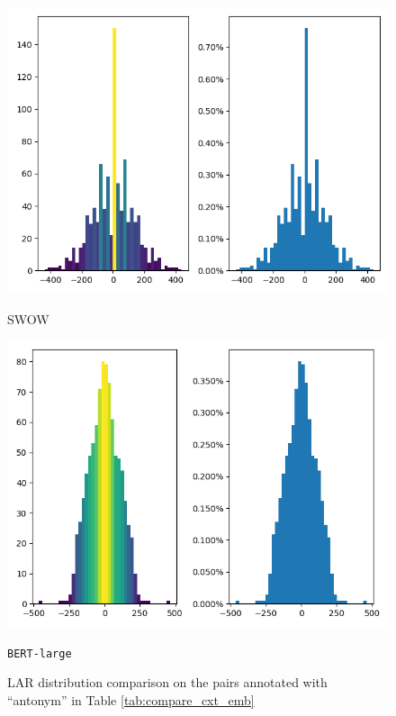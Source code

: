\documentclass[letterpaper]{article} %
\begin{document}
\begin{figure}[!]
\centering
\begin{minipage}[b]{0.45\textwidth}
    \includegraphics[width=\textwidth]{rel_antonym_gtSWOW_bert_large.png}
    \caption*{SWOW}
  \end{minipage}
  \hfill
  \begin{minipage}[b]{0.45\textwidth}
    \includegraphics[width=\textwidth]{rel_antonymSWOW_bert_large.png}
    \caption*{\texttt{BERT-large}}
  \end{minipage}
\caption{LAR distribution comparison on the pairs annotated with ``antonym'' in Table \ref{tab:compare_cxt_emb} }
\label{fig:compare_lar_antonym}
\end{figure}
\end{document}
